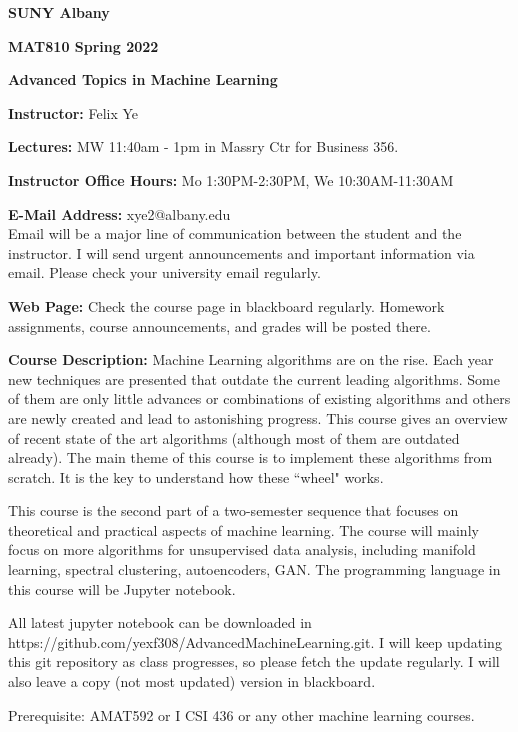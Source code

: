 \documentclass[a4paper,10pt]{article}
\begin{document}
\begin{center}

\textbf{SUNY Albany}

\textbf{MAT810 Spring 2022}

\textbf{Advanced Topics in Machine Learning}


\end{center}

\textbf{Instructor:} Felix Ye 

\textbf{Lectures:} MW 11:40am - 1pm  in Massry Ctr for Business 356.

\textbf{Instructor Office Hours:} Mo 1:30PM-2:30PM, We 10:30AM-11:30AM


\textbf{E-Mail Address:} xye2@albany.edu\\
Email will be a major line of communication between the student and the instructor. I will send urgent announcements and important information via email. Please check your university email regularly.

\textbf{Web Page:}
Check the course page in blackboard regularly. Homework assignments, course announcements, and grades will be posted there.


\textbf{Course Description:}   Machine Learning algorithms are on the rise. Each year new techniques are presented that outdate the current leading algorithms. Some of them are only little advances or combinations of existing algorithms and others are newly created and lead to astonishing progress. This course gives an overview of recent state of the art algorithms (although most of them are outdated already). The main theme of this course is to implement these algorithms from scratch. It is the key to understand how these ``wheel" works. 

This course is the second part of a two-semester sequence that focuses on theoretical and practical aspects of machine learning. The course will mainly focus on more algorithms for unsupervised data analysis, including manifold learning, spectral clustering, autoencoders, GAN.  The programming language in this course will be Jupyter notebook. 

All latest jupyter notebook can be downloaded in https://github.com/yexf308/AdvancedMachineLearning.git. I will keep updating this git repository as class progresses, so please fetch the update regularly. I will also leave a copy (not most updated) version in blackboard. 

 Prerequisite: AMAT592 or I CSI 436 or any other machine learning courses. 
 
\end{document}
